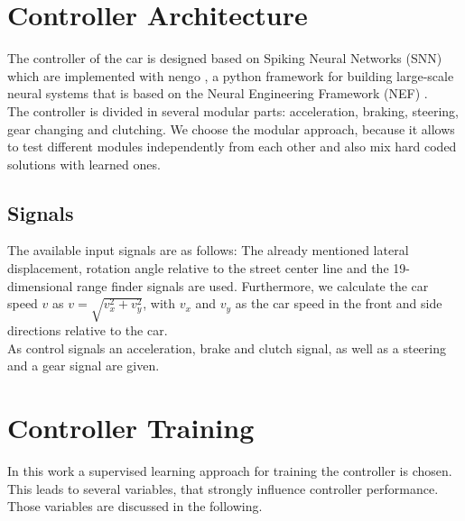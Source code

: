 \documentclass[10pt,a4paper,twoside,journal]{IEEEtran}
\begin{document}
\section{Controller Architecture}
\label{sc:controller}

The controller of the car is designed based on Spiking Neural Networks (SNN) which are implemented with nengo \cite{nengo}, a python framework for building large-scale neural systems that is based on the Neural Engineering Framework (NEF) \cite{nef}. \\
The controller is divided in several modular parts: acceleration, braking, steering, gear changing and clutching. We choose the modular approach, because it allows to test different modules independently from each other and also mix hard coded solutions with learned ones. \\

\subsection{Signals}
The available input signals are as follows: The already mentioned lateral displacement, rotation angle relative to the street center line and the 19-dimensional range finder signals are used. Furthermore, we calculate the car speed $ v $ as $ v = \sqrt{v_x^2 + v_y^2} $, with $ v_x $ and $ v_y $ as the car speed in the front and side directions relative to the car. \\
As control signals an acceleration, brake and clutch signal, as well as a steering and a gear signal are given.

\section{Controller Training}
In this work a supervised learning approach for training the controller is chosen. This leads to several variables, that strongly influence controller performance. Those variables are discussed in the following.
\end{document}
